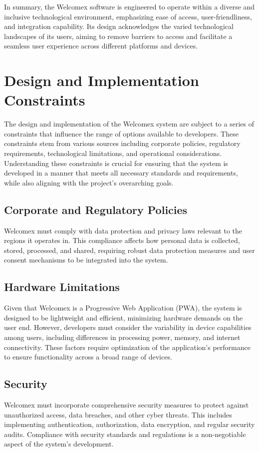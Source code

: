 \documentclass{scrreprt}
\begin{document}
In summary, the Welcomex software is engineered to operate within a diverse and inclusive technological environment, emphasizing ease of access, user-friendliness, and integration capability. Its design acknowledges the varied technological landscapes of its users, aiming to remove barriers to access and facilitate a seamless user experience across different platforms and devices.

\section{Design and Implementation Constraints}
The design and implementation of the Welcomex system are subject to a series of constraints that influence the range of options available to developers. These constraints stem from various sources including corporate policies, regulatory requirements, technological limitations, and operational considerations. Understanding these constraints is crucial for ensuring that the system is developed in a manner that meets all necessary standards and requirements, while also aligning with the project's overarching goals.
\subsection*{Corporate and Regulatory Policies}
Welcomex must comply with data protection and privacy laws relevant to the regions it operates in. This compliance affects how personal data is collected, stored, processed, and shared, requiring robust data protection measures and user consent mechanisms to be integrated into the system.
\subsection*{Hardware Limitations}
Given that Welcomex is a Progressive Web Application (PWA), the system is designed to be lightweight and efficient, minimizing hardware demands on the user end. However, developers must consider the variability in device capabilities among users, including differences in processing power, memory, and internet connectivity. These factors require optimization of the application's performance to ensure functionality across a broad range of devices.
\subsection*{Security}
Welcomex must incorporate comprehensive security measures to protect against unauthorized access, data breaches, and other cyber threats. This includes implementing authentication, authorization, data encryption, and regular security audits. Compliance with security standards and regulations is a non-negotiable aspect of the system's development.
\end{document}
